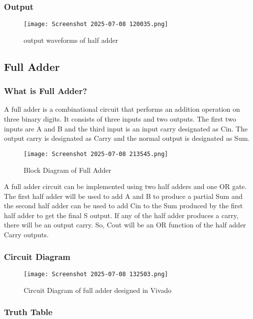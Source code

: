 \documentclass[12pt]{article}
\begin{document}
\subsubsection{Output}
\begin{figure}[H]
    \centering
    \texttt{[image: Screenshot 2025-07-08 120035.png]}
    \caption{output waveforms of half adder}
    \label{fig:enter-label}
\end{figure}

\subsection{Full Adder}
\subsubsection{What is Full Adder?}
A full adder is a combinational circuit that performs an
addition operation on three binary digits. It consists of three
inputs and two outputs. The first two inputs are A and B and
the third input is an input carry designated as Cin. The
output carry is designated as Carry and the normal output is
designated as Sum.
\begin{figure}[H]
    \centering
    \texttt{[image: Screenshot 2025-07-08 213545.png]}
    \caption{Block Diagram of Full Adder}
    \label{fig:enter-label}
\end{figure}

A full adder circuit can be implemented using two half adders
and one OR gate. The first half adder will be used to add A
and B to produce a partial Sum and the second half adder
can be used to add Cin to the Sum produced by the first half
adder to get the final S output. If any of the half adder
produces a carry, there will be an output carry. So, Cout will
be an OR function of the half adder Carry outputs. 

\subsubsection{Circuit Diagram}
\begin{figure}[H]
    \centering
    \texttt{[image: Screenshot 2025-07-08 132503.png]}
    \caption{Circuit Diagram of full adder designed in Vivado}
    \label{fig:enter-label}
\end{figure}

\subsubsection{Truth Table}
\end{document}
